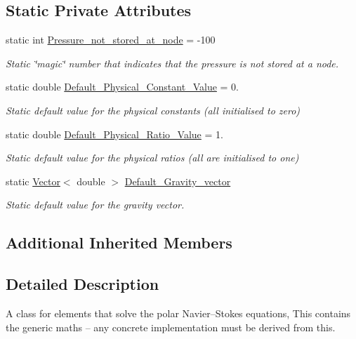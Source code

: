 \subsection*{Static Private Attributes}
\begin{DoxyCompactItemize}
\item 
static int \hyperlink{classoomph_1_1PolarNavierStokesEquations_a8fbf3013addd48f0017c92c5be561f0a}{Pressure\+\_\+not\+\_\+stored\+\_\+at\+\_\+node} = -\/100
\begin{DoxyCompactList}\small\item\em Static \char`\"{}magic\char`\"{} number that indicates that the pressure is not stored at a node. \end{DoxyCompactList}\item 
static double \hyperlink{classoomph_1_1PolarNavierStokesEquations_a21029e3ad077fda4efe1290ed17cfa97}{Default\+\_\+\+Physical\+\_\+\+Constant\+\_\+\+Value} = 0.
\begin{DoxyCompactList}\small\item\em Static default value for the physical constants (all initialised to zero) \end{DoxyCompactList}\item 
static double \hyperlink{classoomph_1_1PolarNavierStokesEquations_a4b8d739e7ab84c6631042bc3bd8c6d9f}{Default\+\_\+\+Physical\+\_\+\+Ratio\+\_\+\+Value} = 1.
\begin{DoxyCompactList}\small\item\em Static default value for the physical ratios (all are initialised to one) \end{DoxyCompactList}\item 
static \hyperlink{classoomph_1_1Vector}{Vector}$<$ double $>$ \hyperlink{classoomph_1_1PolarNavierStokesEquations_a8be5c9ef3e825dac154d8cf41448978d}{Default\+\_\+\+Gravity\+\_\+vector}
\begin{DoxyCompactList}\small\item\em Static default value for the gravity vector. \end{DoxyCompactList}\end{DoxyCompactItemize}
\subsection*{Additional Inherited Members}


\subsection{Detailed Description}
A class for elements that solve the polar Navier--Stokes equations, This contains the generic maths -- any concrete implementation must be derived from this. 

